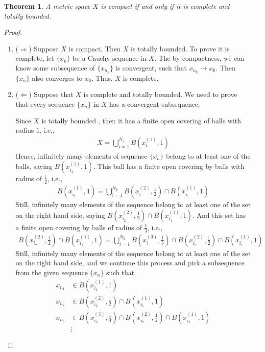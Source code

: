 \documentclass[12pt,leqno]{amsart}
\newtheorem{theorem}{Theorem}[section]
\theoremstyle{definition}
\numberwithin{equation}{subsection}
\begin{document}
\begin{theorem}
A metric space $X$ is compact if and only if it is complete and totally bounded.
\end{theorem}
\begin{proof}
~\begin{enumerate}
    \item ($\Rightarrow$) Suppose $X$ is compact. Then $X$ is totally bounded. To prove it is complete, let $\{x_n\}$ be a Cauchy sequence in $X$.  The by compactness, we can know some subsequence of $\{x_{n_k}\}$ is convergent, such that $x_{n_k}\to x_0$. Then $\{x_n\}$ also converges to $x_0$. Thus, $X$ is complete.
    \item ($\Leftarrow$) Suppose that $X$ is complete and totally bounded. We need to prove that every sequence $\{x_n\}$ in $X$ has a convergent subsequence. 
    
    Since $X$ is totally bounded , then it has a finite open covering of balls with radius $1$, i.e.,
    \begin{align*}
        X = \bigcup^{N_1}_{i=1}B(x_i^{(1)},1)
    \end{align*}
    Hence, infinitely many elements of sequence $\{x_n\}$ belong to at least one of the balls, saying $B(x_{i_1}^{(1)},1)$. This ball has a finite open covering by balls with radius of $\frac{1}{2}$, i.e.,
    \begin{align*}
        B(x_{i_1}^{(1)},1) = \bigcup^{N_2}_{i=1}B\left(x_i^{(2)},\frac{1}{2}\right)\cap B(x_{i_1}^{(1)},1) 
    \end{align*}
    Still, infinitely many elements of the sequence belong to at least one of the set on the right hand side, saying $B\left(x_{i_2}^{(2)},\frac{1}{2}\right)\cap B(x_{i_1}^{(1)},1)$. And this set has a finite open covering by balls of radius of $\frac{1}{3}$, i.e.,
    \begin{align*}
        B\left(x_{i_2}^{(2)},\frac{1}{2}\right)\cap B(x_{i_1}^{(1)},1) = \bigcup^{N_3}_{i=1} B\left(x_{i}^{(3)},\frac{1}{3}\right)\cap B\left(x_{i_2}^{(2)},\frac{1}{2}\right)\cap B(x_{i_1}^{(1)},1)
    \end{align*}
    Still, infinitely many elements of the sequence belong to at least one of the set on the right hand side, and we continue this process and pick a subsequence from the given sequence $\{x_n\}$ such that 
    \begin{align*}
        x_{n_1} &\in B(x_{i_1}^{(1)},1) \\
        x_{n_2} &\in B\left(x_{i_2}^{(2)},\frac{1}{2}\right)\cap B(x_{i_1}^{(1)},1) \\
        x_{n_3} &\in B\left(x_{i_3}^{(3)},\frac{1}{3}\right)\cap B\left(x_{i_2}^{(2)},\frac{1}{2}\right)\cap B(x_{i_1}^{(1)},1)\\
        & \vdots
    \end{align*}
    

\end{enumerate}
\end{proof}
\end{document}
